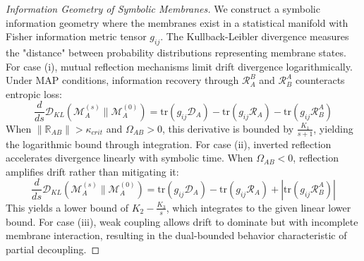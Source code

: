 \begin{proof}[Information Geometry of Symbolic Membranes]
\label{proof:bk5_information_geometry_symbolic}
We construct a symbolic information geometry where the membranes exist in a statistical manifold with Fisher information metric tensor $g_{ij}$. The Kullback-Leibler divergence measures the "distance" between probability distributions representing membrane states.
For case (i), mutual reflection mechanisms limit drift divergence logarithmically. Under MAP conditions, information recovery through $\mathcal{R}_A^B$ and $\mathcal{R}_B^A$ counteracts entropic loss:
\begin{equation}
\frac{d}{ds}\mathcal{D}_{KL}(\mathscr{M}_A^{(s)} \parallel \mathscr{M}_A^{(0)}) = \text{tr}(g_{ij}\mathcal{D}_A) - \text{tr}(g_{ij}\mathcal{R}_A) - \text{tr}(g_{ij}\mathcal{R}_B^A)
\end{equation}
When $\|\mathbb{R}_{AB}\| > \kappa_{crit}$ and $\Omega_{AB} > 0$, this derivative is bounded by $\frac{K_1}{s+1}$, yielding the logarithmic bound through integration.
For case (ii), inverted reflection accelerates divergence linearly with symbolic time. When $\Omega_{AB} < 0$, reflection amplifies drift rather than mitigating it:
\begin{equation}
\frac{d}{ds}\mathcal{D}_{KL}(\mathscr{M}_A^{(s)} \parallel \mathscr{M}_A^{(0)}) = \text{tr}(g_{ij}\mathcal{D}_A) - \text{tr}(g_{ij}\mathcal{R}_A) + |\text{tr}(g_{ij}\mathcal{R}_B^A)|
\end{equation}
This yields a lower bound of $K_2 - \frac{K_3}{s}$, which integrates to the given linear lower bound.
For case (iii), weak coupling allows drift to dominate but with incomplete membrane interaction, resulting in the dual-bounded behavior characteristic of partial decoupling.
\end{proof}
